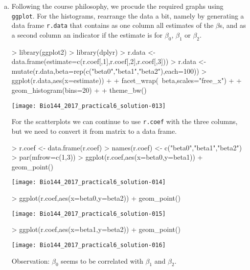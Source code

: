 \documentclass[a4paper,12pt]{scrartcl}
\begin{document}
\begin{enumerate}[a)]
\item Following the course philosophy, we procude the required graphs using \texttt{ggplot}. For the histograms, rearrange the data a bit, namely by generating a data frame \texttt{r.data} that contains as one column all estimates of the $\beta$s, and as a second column an indicator if the estimate is for $\beta_0$, $\beta_1$ or $\beta_2$. 
\begin{Schunk}
\begin{Sinput}
> library(ggplot2)
> library(dplyr)
> r.data <- data.frame(estimate=c(r.coef[,1],r.coef[,2],r.coef[,3]))
> r.data <- mutate(r.data,beta=rep(c("beta0","beta1","beta2"),each=100))
> ggplot(r.data,aes(x=estimate)) +  
+   facet_wrap(~beta,scales="free_x") + 
+   geom_histogram(bins=20) + 
+   theme_bw()
\end{Sinput}
\end{Schunk}
\texttt{[image: Bio144\_2017\_practical6\_solution-013]}




% 
For the scatterplots we can continue to use \texttt{r.coef} with the three columns, but we need to convert it from matrix to a data frame.

\begin{Schunk}
\begin{Sinput}
> r.coef <- data.frame(r.coef)
> names(r.coef) <- c("beta0","beta1","beta2")
> par(mfrow=c(1,3))
> ggplot(r.coef,aes(x=beta0,y=beta1)) + geom_point()  
\end{Sinput}
\end{Schunk}
\texttt{[image: Bio144\_2017\_practical6\_solution-014]}
\begin{Schunk}
\begin{Sinput}
> ggplot(r.coef,aes(x=beta0,y=beta2)) + geom_point()
\end{Sinput}
\end{Schunk}
\texttt{[image: Bio144\_2017\_practical6\_solution-015]}
\begin{Schunk}
\begin{Sinput}
> ggplot(r.coef,aes(x=beta1,y=beta2)) + geom_point()
\end{Sinput}
\end{Schunk}
\texttt{[image: Bio144\_2017\_practical6\_solution-016]}

Observation:  $\beta_0$ seems to be correlated with $\beta_1$ and $\beta_2$.

\end{enumerate}
\end{document}
